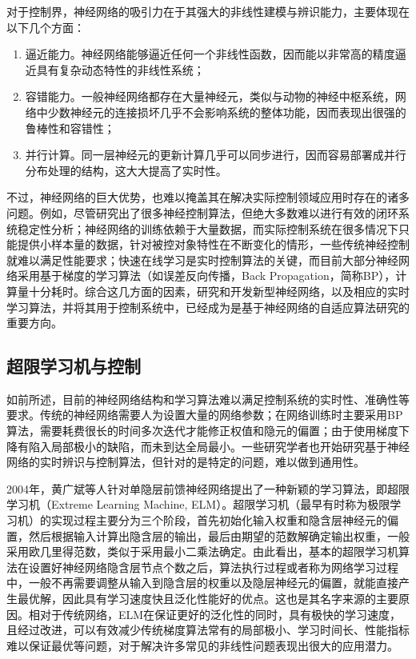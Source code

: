对于控制界，神经网络的吸引力在于其强大的非线性建模与辨识能力，主要体现在以下几个方面：
\begin{enumerate}
\item 逼近能力。神经网络能够逼近任何一个非线性函数，因而能以非常高的精度逼近具有复杂动态特性的非线性系统；
\item 容错能力。一般神经网络都存在大量神经元，类似与动物的神经中枢系统，网络中少数神经元的连接损坏几乎不会影响系统的整体功能，因而表现出很强的鲁棒性和容错性；
\item 并行计算。同一层神经元的更新计算几乎可以同步进行，因而容易部署成并行分布处理的结构，这大大提高了实时性。
\end{enumerate}

不过，神经网络的巨大优势，也难以掩盖其在解决实际控制领域应用时存在的诸多问题。例如，尽管研究出了很多神经控制算法，但绝大多数难以进行有效的闭环系统稳定性分析；神经网络的训练依赖于大量数据，而实际控制系统在很多情况下只能提供小样本量的数据，针对被控对象特性在不断变化的情形，一些传统神经控制就难以满足性能要求；快速在线学习是实时控制算法的关键，而目前大部分神经网络采用基于梯度的学习算法（如误差反向传播，Back Propagation，简称BP），计算量十分耗时。综合这几方面的因素，研究和开发新型神经网络，以及相应的实时学习算法，并将其用于控制系统中，已经成为是基于神经网络的自适应算法研究的重要方向。

\subsection{超限学习机与控制}

如前所述，目前的神经网络结构和学习算法难以满足控制系统的实时性、准确性等要求。传统的神经网络需要人为设置大量的网络参数；在网络训练时主要采用BP算法，需要耗费很长的时间多次迭代才能修正权值和隐元的偏置；由于使用梯度下降有陷入局部极小的缺陷，而未到达全局最小。一些研究学者也开始研究基于神经网络的实时辨识与控制算法，但针对的是特定的问题，难以做到通用性。

2004年，黄广斌等人针对单隐层前馈神经网络提出了一种新颖的学习算法，即超限学习机（Extreme Learning Machine, ELM）。超限学习机（最早有时称为极限学习机）的实现过程主要分为三个阶段，首先初始化输入权重和隐含层神经元的偏置，然后根据输入计算出隐含层的输出，最后由期望的范数解确定输出权重，一般采用欧几里得范数，类似于采用最小二乘法确定。由此看出，基本的超限学习机算法在设置好神经网络隐含层节点个数之后，算法执行过程或者称为网络学习过程中，一般不再需要调整从输入到隐含层的权重以及隐层神经元的偏置，就能直接产生最优解，因此具有学习速度快且泛化性能好的优点。这也是其名字来源的主要原因。相对于传统网络，ELM在保证更好的泛化性的同时，具有极快的学习速度，且经过改进，可以有效减少传统梯度算法常有的局部极小、学习时间长、性能指标难以保证最优等问题，对于解决许多常见的非线性问题表现出很大的应用潜力。

